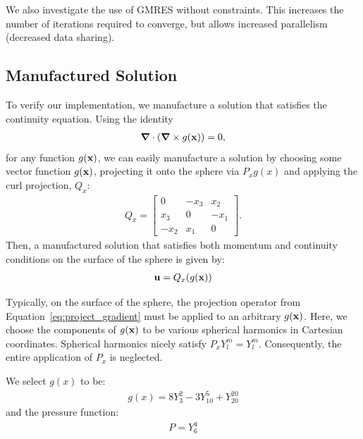 We also investigate the use of GMRES without constraints. This increases the number of iterations required to converge, but allows increased parallelism (decreased data sharing). %

\subsection{Manufactured Solution}

To verify our implementation, we manufacture a solution that satisfies the continuity equation. Using the identity
\begin{align} 
\mbox{\boldmath$ \nabla $} \cdot (\mbox{\boldmath$ \nabla $} \times g(\mathbf{x})) = 0,
\end{align} 
for any function $g(\mathbf{x})$, we can easily manufacture a solution by choosing some vector function $g(\mathbf{x})$, projecting it onto the sphere via $P_x g(x)$ and applying the curl projection, $Q_x$: 
\begin{align} 
Q_x = \begin{bmatrix} 0 & -x_3 & x_2 \\ x_3 & 0 & -x_1 \\ -x_2 & x_1 & 0 \end{bmatrix}.
\end{align} 
Then, a manufactured solution that satisfies both momentum and continuity conditions on the surface of the sphere is given by: 
\begin{align} 
\mathbf{u} = Q_x (g(\mathbf{x}))
\end{align} 

Typically, on the surface of the sphere, the projection operator from Equation~\ref{eq:project_gradient} must be applied to an arbitrary $g(\mathbf{x})$. 
Here, we choose the components of $g(\mathbf{x})$ to be various spherical harmonics in Cartesian coordinates. Spherical harmonics nicely satisfy $P_x Y_l^m = Y_l^m$. Consequently, the entire application of $P_x$ is neglected. 



We select $g(x)$ to be: 
\begin{align}
g(x) = 8 Y_{3}^{2} - 3Y_{10}^{5} + Y_{20}^{20} 
\end{align}
and the pressure function:
\begin{align}
P = Y_6^4 
\end{align} 

